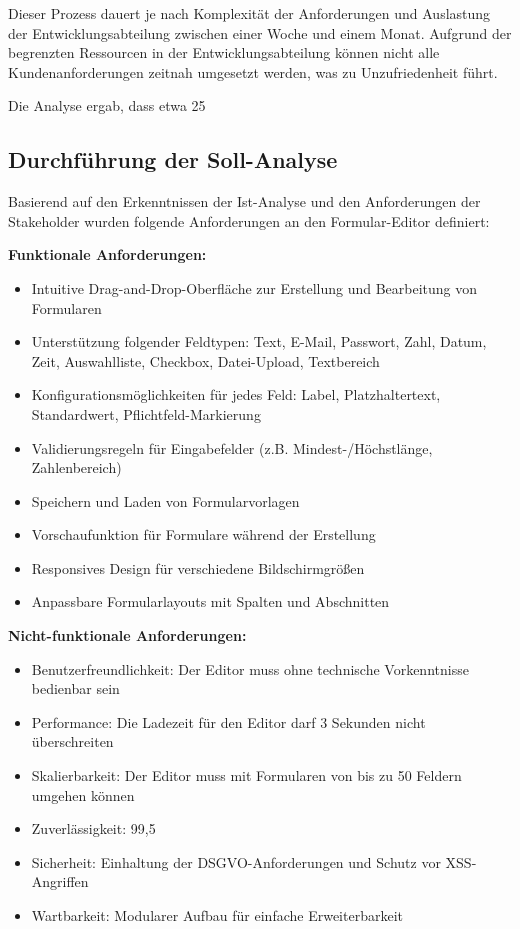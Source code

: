\documentclass[a4paper,11pt]{article}
\begin{document}
Dieser Prozess dauert je nach Komplexität der Anforderungen und Auslastung der Entwicklungsabteilung zwischen einer Woche und einem Monat. Aufgrund der begrenzten Ressourcen in der Entwicklungsabteilung können nicht alle Kundenanforderungen zeitnah umgesetzt werden, was zu Unzufriedenheit führt.

Die Analyse ergab, dass etwa 25%

\subsection{Durchführung der Soll-Analyse}
Basierend auf den Erkenntnissen der Ist-Analyse und den Anforderungen der Stakeholder wurden folgende Anforderungen an den Formular-Editor definiert:

\textbf{Funktionale Anforderungen:}
\begin{itemize}
  \item Intuitive Drag-and-Drop-Oberfläche zur Erstellung und Bearbeitung von Formularen
  \item Unterstützung folgender Feldtypen: Text, E-Mail, Passwort, Zahl, Datum, Zeit, Auswahlliste, Checkbox, Datei-Upload, Textbereich
  \item Konfigurationsmöglichkeiten für jedes Feld: Label, Platzhaltertext, Standardwert, Pflichtfeld-Markierung
  \item Validierungsregeln für Eingabefelder (z.B. Mindest-/Höchstlänge, Zahlenbereich)
  \item Speichern und Laden von Formularvorlagen
  \item Vorschaufunktion für Formulare während der Erstellung
  \item Responsives Design für verschiedene Bildschirmgrößen
  \item Anpassbare Formularlayouts mit Spalten und Abschnitten
\end{itemize}

\textbf{Nicht-funktionale Anforderungen:}
\begin{itemize}
  \item Benutzerfreundlichkeit: Der Editor muss ohne technische Vorkenntnisse bedienbar sein
  \item Performance: Die Ladezeit für den Editor darf 3 Sekunden nicht überschreiten
  \item Skalierbarkeit: Der Editor muss mit Formularen von bis zu 50 Feldern umgehen können
  \item Zuverlässigkeit: 99,5%
  \item Sicherheit: Einhaltung der DSGVO-Anforderungen und Schutz vor XSS-Angriffen
  \item Wartbarkeit: Modularer Aufbau für einfache Erweiterbarkeit
\end{itemize}
\end{document}
